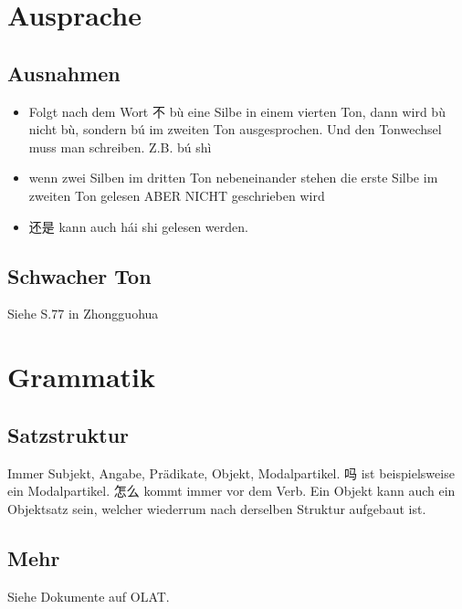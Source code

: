 \documentclass[UTF8]{ctexart}
\begin{document}
\section{Ausprache}

\subsection{Ausnahmen}

\begin{itemize}
    \item Folgt nach dem Wort 不 bù eine Silbe in einem vierten Ton, dann wird bù nicht bù,
    sondern bú im zweiten Ton ausgesprochen. Und den Tonwechsel muss man
    schreiben. Z.B. bú shì
    \item wenn zwei Silben im dritten Ton nebeneinander stehen die erste Silbe im zweiten
    Ton gelesen ABER NICHT geschrieben wird
    \item 还是 kann auch hái shi gelesen werden.
\end{itemize}

\subsection{Schwacher Ton}

Siehe S.77 in Zhongguohua

\section{Grammatik}

\subsection{Satzstruktur}

Immer Subjekt, Angabe, Prädikate, Objekt, Modalpartikel.
吗 ist beispielsweise ein Modalpartikel. 怎么 kommt immer vor dem Verb. Ein Objekt kann auch ein Objektsatz sein, welcher wiederrum nach derselben Struktur aufgebaut ist.

\subsection{Mehr}

Siehe Dokumente auf OLAT.
\end{document}
